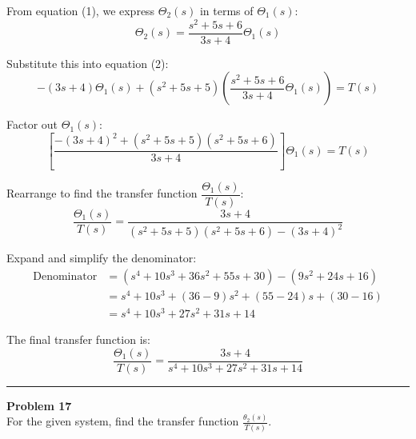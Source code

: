 \documentclass[11pt]{article}
\begin{document}
From equation (1), we express $\Theta_2(s)$ in terms of $\Theta_1(s)$:
\[
\Theta_2(s) = \frac{s^2 + 5s + 6}{3s + 4} \Theta_1(s)
\]

Substitute this into equation (2):
\[
-(3s + 4)\Theta_1(s) + (s^2 + 5s + 5) \left( \frac{s^2 + 5s + 6}{3s + 4} \Theta_1(s) \right) = T(s)
\]

Factor out $\Theta_1(s)$:
\[
\left[ \frac{-(3s + 4)^2 + (s^2 + 5s + 5)(s^2 + 5s + 6)}{3s + 4} \right] \Theta_1(s) = T(s)
\]

Rearrange to find the transfer function $\dfrac{\Theta_1(s)}{T(s)}$:
\[
\frac{\Theta_1(s)}{T(s)} = \frac{3s + 4}{(s^2 + 5s + 5)(s^2 + 5s + 6) - (3s + 4)^2}
\]

Expand and simplify the denominator:
\begin{align*}
    \text{Denominator} &= (s^4 + 10s^3 + 36s^2 + 55s + 30) - (9s^2 + 24s + 16) \\
    &= s^4 + 10s^3 + (36 - 9)s^2 + (55 - 24)s + (30 - 16) \\
    &= s^4 + 10s^3 + 27s^2 + 31s + 14
\end{align*}

The final transfer function is:
\[
\boxed{\frac{\Theta_1(s)}{T(s)} = \frac{3s + 4}{s^4 + 10s^3 + 27s^2 + 31s + 14}}
\]

\newpage
  \setcounter{page}{32}  
\noindent\rule{\textwidth}{1pt}
\noindent\textbf{Problem 17} \hfill 
\\ For the given system, find the transfer function $\frac{\theta_2(s)}{T(s)}$.
\end{document}
